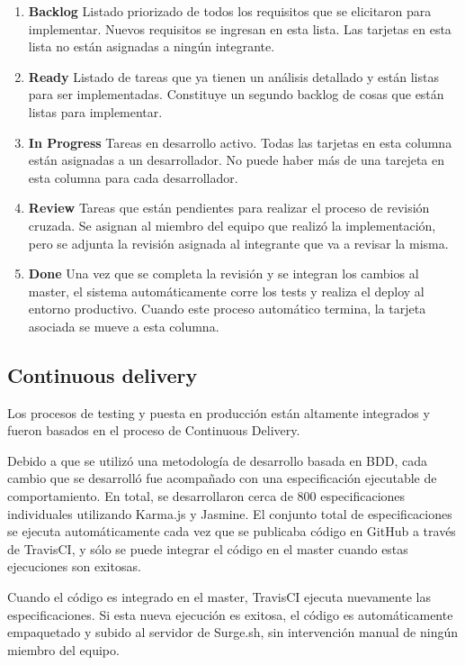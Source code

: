 \documentclass[a4paper,11pt]{article}
\begin{document}
\begin{enumerate}
    \item \textbf{Backlog} Listado priorizado de todos los requisitos que se elicitaron para implementar. Nuevos requisitos se ingresan en esta lista. Las tarjetas en esta lista no están asignadas a ningún integrante.
    \item \textbf{Ready} Listado de tareas que ya tienen un análisis detallado y están listas para ser implementadas. Constituye un segundo backlog de cosas que están listas para implementar.
    \item \textbf{In Progress} Tareas en desarrollo activo. Todas las tarjetas en esta columna están asignadas a un desarrollador. No puede haber más de una tarejeta en esta columna para cada desarrollador.
    \item \textbf{Review} Tareas que están pendientes para realizar el proceso de revisión cruzada. Se asignan al miembro del equipo que realizó la implementación, pero se adjunta la revisión asignada al integrante que va a revisar la misma.
    \item \textbf{Done} Una vez que se completa la revisión y se integran los cambios al master, el sistema automáticamente corre los tests y realiza el deploy al entorno productivo. Cuando este proceso automático termina, la tarjeta asociada se mueve a esta columna.
\end{enumerate}


\subsection{Continuous delivery}

Los procesos de testing y puesta en producción están altamente integrados y fueron basados en el proceso de Continuous Delivery\cite{cd}.

Debido a que se utilizó una metodología de desarrollo basada en BDD\cite{bdd}, cada cambio que se desarrolló fue acompañado con una especificación ejecutable de comportamiento. En total, se desarrollaron cerca de 800 especificaciones individuales utilizando Karma.js\cite{karma} y Jasmine\cite{jasmine}. El conjunto total de especificaciones se ejecuta automáticamente cada vez que se publicaba código en GitHub a través de TravisCI\cite{travis}, y sólo se puede integrar el código en el master cuando estas ejecuciones son exitosas.

Cuando el código es integrado en el master, TravisCI ejecuta nuevamente las especificaciones. Si esta nueva ejecución es exitosa, el código es automáticamente empaquetado y subido al servidor de Surge.sh, sin intervención manual de ningún miembro del equipo.
\end{document}
